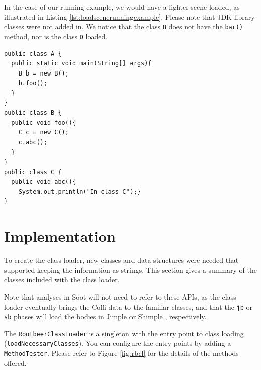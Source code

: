 \documentclass{sigplanconf}
\begin{document}
In the case of our running example, we would have a lighter scene loaded, as illustrated in Listing \ref{lst:loadscenerunningexample}. Please note that JDK library classes were not added in. We notice that the class {\tt B} does not have the {\tt bar()} method, nor is the class {\tt D} loaded.

\begin{lstlisting}[caption={Loaded Scene for Running example},label={lst:loadscenerunningexample},float=!ht]
public class A {
  public static void main(String[] args){
    B b = new B();
    b.foo();
  }
}
public class B {
  public void foo(){
    C c = new C();
    c.abc();
  }
}
public class C {
  public void abc(){
    System.out.println("In class C");}
}
\end{lstlisting}

\section{Implementation} %
\label{sec:api}
To create the \rb class loader, new classes and data structures were needed that supported keeping the information as strings. This section gives a summary of the classes included with the \rb class loader.

Note that analyses in Soot will not need to refer to these APIs, as the class loader eventually brings the Coffi data to the familiar classes, and that the {\tt jb} or {\tt sb} phases will load the bodies in Jimple \cite{jimpletr} or Shimple \cite{shimple}, respectively.

The {\tt RootbeerClassLoader} is a singleton with the entry point to class loading ({\tt loadNecessaryClasses}). You can configure the entry points by adding a {\tt MethodTester}. Please refer to Figure \ref{fig:rbcl} for the details of the methods offered.
\end{document}
